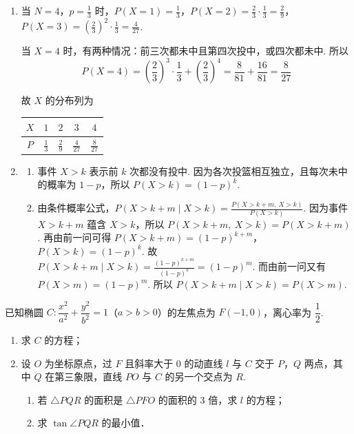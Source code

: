 \begin{solution}
\begin{enumerate}
\item 当 \(N=4\)，\(p=\frac{1}{3}\) 时，\(P\left( X=1 \right)=\frac{1}{3}\)，\(P\left( X=2 \right)=\frac{2}{3}\cdot \frac{1}{3}=\frac{2}{9}\)，\(P\left( X=3 \right)=\left( \frac{2}{3} \right)^2\cdot \frac{1}{3}=\frac{4}{27}\).

当 \(X=4\) 时，有两种情况：前三次都未中且第四次投中，或四次都未中. 所以
\[
P\left( X=4 \right)=\left( \frac{2}{3} \right)^3\cdot \frac{1}{3}+\left( \frac{2}{3} \right)^4=\frac{8}{81}+\frac{16}{81}=\frac{8}{27}
\]

故 \(X\) 的分布列为
{\centering
\begin{tabular}{c|cccc}
\(X\) & \(1\) & \(2\) & \(3\) & \(4\) \\
\hline
\(P\) & \(\frac{1}{3}\) & \(\frac{2}{9}\) & \(\frac{4}{27}\) & \(\frac{8}{27}\)
\end{tabular}
\par}

\item
\begin{enumerate}
\item 事件 \(X>k\) 表示前 \(k\) 次都没有投中. 因为各次投篮相互独立，且每次未中的概率为 \(1-p\)，所以 \(P\left( X>k \right)=\left( 1-p \right)^k\).

\item 由条件概率公式，\(P\left( X>k+m\mid X>k \right)=\frac{P\left( X>k+m,\ X>k \right)}{P\left( X>k \right)}\). 因为事件 \(X>k+m\) 蕴含 \(X>k\)，所以 \(P\left( X>k+m,\ X>k \right)=P\left( X>k+m \right)\). 再由前一问可得 \(P\left( X>k+m \right)=\left( 1-p \right)^{k+m}\)，\(P\left( X>k \right)=\left( 1-p \right)^k\). 故 \(P\left( X>k+m\mid X>k \right)=\frac{\left( 1-p \right)^{k+m}}{\left( 1-p \right)^k}=\left( 1-p \right)^m\). 而由前一问又有 \(P\left( X>m \right)=\left( 1-p \right)^m\). 所以 \(P\left( X>k+m\mid X>k \right)=P\left( X>m \right)\).
\end{enumerate}
\end{enumerate}
\end{solution}

\begin{problem}
已知椭圆 \(C:\dfrac{x^2}{a^2}+\dfrac{y^2}{b^2}=1\)（\(a>b>0\)）的左焦点为 \(F(-1,0)\)，离心率为 \(\dfrac{1}{2}\).

\begin{enumerate}
\item 求 \(C\) 的方程；
\item 设 \(O\) 为坐标原点，过 \(F\) 且斜率大于 \(0\) 的动直线 \(l\) 与 \(C\) 交于 \(P\)，\(Q\) 两点，其中 \(Q\) 在第三象限，直线 \(PO\) 与 \(C\) 的另一个交点为 \(R\).
\begin{enumerate}
\item 若 \(\triangle PQR\) 的面积是 \(\triangle PFO\) 的面积的 \(3\) 倍，求 \(l\) 的方程；
\item 求 \(\tan \angle PQR\) 的最小值．
\end{enumerate}
\end{enumerate}
\end{problem}

